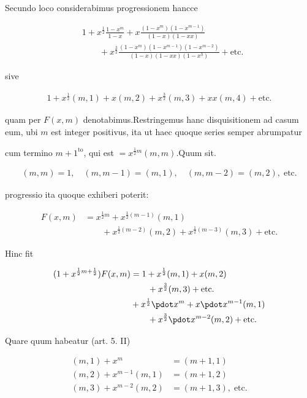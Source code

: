 
Secundo loco considerabimus progressionem hancce

\[
\begin{aligned}
&1+x^{\frac12}\frac{1-x^m}{1-x}+x\frac{(1-x^m)(1-x^{m-1})}{(1-x)(1-xx)}\\
&\qquad+x^{\frac32}\frac{(1-x^m)(1-x^{m-1})(1-x^{m-2})}{(1-x)(1-xx)(1-x^3)}+\text{etc.}
\end{aligned}
\]

sive

\[
\begin{aligned}
1+x^{\frac12}(m,1)+x(m,2)+x^{\frac32}(m,3)+xx(m,4)+\text{etc.}
\end{aligned}
\]

quam per $F(x,m)$ denotabimus.\quad Restringemus hanc disquisitionem ad casum eum, ubi $m$ est integer positivus, ita ut haec quoque series semper abrumpatur 

cum termino $m+1^{\mathrm{to}}$, qui est $=x^{\frac12m}(m,m)$.\quad Quum sit.

\[
\begin{aligned}
(m,m)=1,\quad(m,m-1)=(m,1),\quad(m,m-2)=(m,2),\;\text{etc.}
\end{aligned}
\]

progressio ita quoque exhiberi poterit:

\[
\begin{aligned}
F(x,m)&=x^{\frac12m}+x^{\frac12(m-1)}(m,1)\\&\qquad+x^{\frac12(m-2)}(m,2)+x^{\frac12(m-3)}(m,3)+\text{etc.}
\end{aligned}
\]

Hinc fit

\[
\begin{aligned}
(1+x^{\frac12m+\frac12})F(x,m)&=1+x^{\frac12}(m,1)+x(m,2)\\&\qquad+x^{\frac32}(m,3)+\text{etc.}\\
&+x^{\frac12}\pdot x^m+x\pdot x^{m-1}(m,1)\\&\qquad+x^{\frac32}\pdot x^{m-2}(m,2)+\text{etc.}
\end{aligned}
\]

Quare quum habeatur (art. 5. II)

\[
\begin{aligned}
(m,1)+x^m&=(m+1,1)\\
(m,2)+x^{m-1}(m,1)&=(m+1,2)\\
(m,3)+x^{m-2}(m,2)&=(m+1,3),\;\text{etc.}
\end{aligned}
\]

